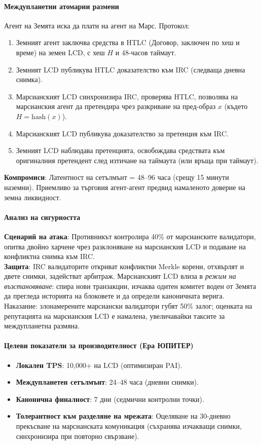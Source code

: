 \documentclass[11pt]{article}
\begin{document}
\paragraph{Междупланетни атомарни размени}
Агент на Земята иска да плати на агент на Марс. Протокол:
\begin{enumerate}[noitemsep]
  \item Земният агент заключва средства в HTLC (Договор, заключен по хеш и време) на земен LCD, с хеш $H$ и 48-часов таймаут.
  \item Земният LCD публикува HTLC доказателство към IRC (следваща дневна снимка).
  \item Марсианският LCD синхронизира IRC, проверява HTLC, позволява на марсианския агент да претендира чрез разкриване на пред-образ $x$ (където $H = \text{hash}(x)$).
  \item Марсианският LCD публикува доказателство за претенция към IRC.
  \item Земният LCD наблюдава претенцията, освобождава средствата към оригиналния претендент след изтичане на таймаута (или връща при таймаут).
\end{enumerate}
\textbf{Компромиси}: Латентност на сетълмънт = 48--96 часа (срещу 15 минути наземни). Приемливо за търговия агент-агент предвид намаленото доверие на земна ликвидност.

\paragraph{Анализ на сигурността}
\textbf{Сценарий на атака}: Противникът контролира 40\% от марсианските валидатори, опитва двойно харчене чрез разклоняване на марсианския LCD и подаване на конфликтна снимка към IRC.\\
\textbf{Защита}: IRC валидаторите откриват конфликтни Merkle корени, отхвърлят и двете снимки, задействат арбитраж. Марсианският LCD влиза в \emph{режим на възстановяване}: спира нови транзакции, изчаква одитен комитет воден от Земята да прегледа историята на блоковете и да определи каноничната верига. Наказание: злонамерените марсиански валидатори губят 50\% залог; оценката на репутацията на марсианския LCD е намалена, увеличавайки таксите за междупланетна размяна.

\paragraph{Целеви показатели за производителност (Ера ЮПИТЕР)}
\begin{itemize}[noitemsep]
  \item \textbf{Локален TPS}: 10,000+ на LCD (оптимизиран PAI).
  \item \textbf{Междупланетен сетълмънт}: 24--48 часа (дневни снимки).
  \item \textbf{Канонична финалност}: 7 дни (седмични контролни точки).
  \item \textbf{Толерантност към разделяне на мрежата}: Оцеляване на 30-дневно прекъсване на марсианската комуникация (съхранява изчакващи снимки, синхронизира при повторно свързване).
\end{itemize}
\end{document}
